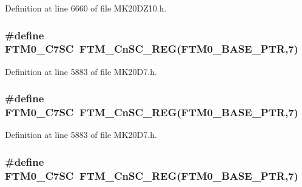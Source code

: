 Definition at line 6660 of file M\+K20\+D\+Z10.\+h.

\subsubsection[{\texorpdfstring{F\+T\+M0\+\_\+\+C7\+SC}{FTM0_C7SC}}]{\setlength{\rightskip}{0pt plus 5cm}\#define F\+T\+M0\+\_\+\+C7\+SC~{\bf F\+T\+M\+\_\+\+Cn\+S\+C\+\_\+\+R\+EG}({\bf F\+T\+M0\+\_\+\+B\+A\+S\+E\+\_\+\+P\+TR},7)}\hypertarget{group___f_t_m___register___accessor___macros_ga6ea486158eaa49e680e99baef5ef19e9}{}\label{group___f_t_m___register___accessor___macros_ga6ea486158eaa49e680e99baef5ef19e9}


Definition at line 5883 of file M\+K20\+D7.\+h.

\subsubsection[{\texorpdfstring{F\+T\+M0\+\_\+\+C7\+SC}{FTM0_C7SC}}]{\setlength{\rightskip}{0pt plus 5cm}\#define F\+T\+M0\+\_\+\+C7\+SC~{\bf F\+T\+M\+\_\+\+Cn\+S\+C\+\_\+\+R\+EG}({\bf F\+T\+M0\+\_\+\+B\+A\+S\+E\+\_\+\+P\+TR},7)}\hypertarget{group___f_t_m___register___accessor___macros_ga6ea486158eaa49e680e99baef5ef19e9}{}\label{group___f_t_m___register___accessor___macros_ga6ea486158eaa49e680e99baef5ef19e9}


Definition at line 5883 of file M\+K20\+D7.\+h.

\subsubsection[{\texorpdfstring{F\+T\+M0\+\_\+\+C7\+SC}{FTM0_C7SC}}]{\setlength{\rightskip}{0pt plus 5cm}\#define F\+T\+M0\+\_\+\+C7\+SC~{\bf F\+T\+M\+\_\+\+Cn\+S\+C\+\_\+\+R\+EG}({\bf F\+T\+M0\+\_\+\+B\+A\+S\+E\+\_\+\+P\+TR},7)}\hypertarget{group___f_t_m___register___accessor___macros_ga6ea486158eaa49e680e99baef5ef19e9}{}\label{group___f_t_m___register___accessor___macros_ga6ea486158eaa49e680e99baef5ef19e9}


